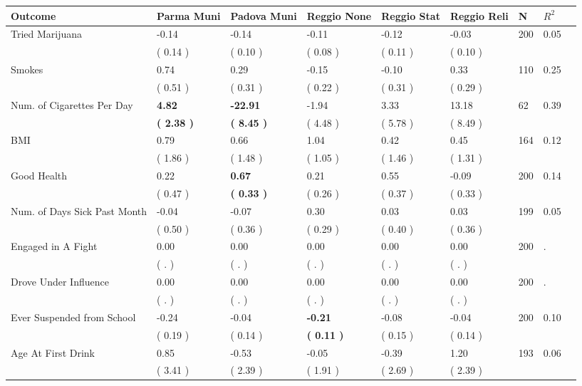 \begin{tabular}{L{6.2cm} C{1.8cm} C{1.8cm} C{1.8cm} C{1.8cm} C{1.8cm} C{1.8cm} C{0.3cm} C{0.3cm}}
\toprule
 \textbf{Outcome} & \textbf{Parma Muni} & \textbf{Padova Muni} & \textbf{Reggio None} & \textbf{Reggio Stat} & \textbf{Reggio Reli} & \textbf{N} & \textbf{$ R^2$} \\
\midrule
Tried Marijuana &     -0.14 &     -0.14 &     -0.11 &     -0.12 &     -0.03  & 200 &       0.05 \\ 
 & (     0.14 ) & (     0.10 ) & (     0.08 ) & (     0.11 ) & (     0.10 )  & \\
Smokes &      0.74 &      0.29 &     -0.15 &     -0.10 &      0.33  & 110 &       0.25 \\ 
 & (     0.51 ) & (     0.31 ) & (     0.22 ) & (     0.31 ) & (     0.29 )  & \\
Num. of Cigarettes Per Day & \textbf{     4.82} & \textbf{   -22.91} &     -1.94 &      3.33 &     13.18  & 62 &       0.39 \\ 
 & \textbf{(     2.38 )} & \textbf{(     8.45 )} & (     4.48 ) & (     5.78 ) & (     8.49 )  & \\
BMI &      0.79 &      0.66 &      1.04 &      0.42 &      0.45  & 164 &       0.12 \\ 
 & (     1.86 ) & (     1.48 ) & (     1.05 ) & (     1.46 ) & (     1.31 )  & \\
Good Health &      0.22 & \textbf{     0.67} &      0.21 &      0.55 &     -0.09  & 200 &       0.14 \\ 
 & (     0.47 ) & \textbf{(     0.33 )} & (     0.26 ) & (     0.37 ) & (     0.33 )  & \\
Num. of Days Sick Past Month &     -0.04 &     -0.07 &      0.30 &      0.03 &      0.03  & 199 &       0.05 \\ 
 & (     0.50 ) & (     0.36 ) & (     0.29 ) & (     0.40 ) & (     0.36 )  & \\
Engaged in A Fight &      0.00 &      0.00 &      0.00 &      0.00 &      0.00  & 200 &          . \\ 
 & (        . ) & (        . ) & (        . ) & (        . ) & (        . )  & \\
Drove Under Influence &      0.00 &      0.00 &      0.00 &      0.00 &      0.00  & 200 &          . \\ 
 & (        . ) & (        . ) & (        . ) & (        . ) & (        . )  & \\
Ever Suspended from School &     -0.24 &     -0.04 & \textbf{    -0.21} &     -0.08 &     -0.04  & 200 &       0.10 \\ 
 & (     0.19 ) & (     0.14 ) & \textbf{(     0.11 )} & (     0.15 ) & (     0.14 )  & \\
Age At First Drink &      0.85 &     -0.53 &     -0.05 &     -0.39 &      1.20  & 193 &       0.06 \\ 
 & (     3.41 ) & (     2.39 ) & (     1.91 ) & (     2.69 ) & (     2.39 )  & \\
\bottomrule
\end{tabular}
